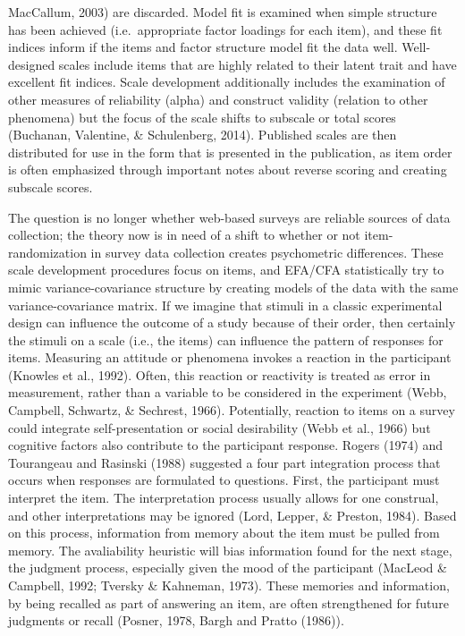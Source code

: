 \documentclass[english,man, mask]{apa6}
\theoremstyle{definition}
\theoremstyle{definition}
\theoremstyle{definition}
\theoremstyle{remark}
\begin{document}
MacCallum, 2003) are discarded. Model fit is examined when simple
structure has been achieved (i.e.~appropriate factor loadings for each
item), and these fit indices inform if the items and factor structure
model fit the data well. Well-designed scales include items that are
highly related to their latent trait and have excellent fit indices.
Scale development additionally includes the examination of other
measures of reliability (alpha) and construct validity (relation to
other phenomena) but the focus of the scale shifts to subscale or total
scores (Buchanan, Valentine, \& Schulenberg, 2014). Published scales are
then distributed for use in the form that is presented in the
publication, as item order is often emphasized through important notes
about reverse scoring and creating subscale scores.

The question is no longer whether web-based surveys are reliable sources
of data collection; the theory now is in need of a shift to whether or
not item-randomization in survey data collection creates psychometric
differences. These scale development procedures focus on items, and
EFA/CFA statistically try to mimic variance-covariance structure by
creating models of the data with the same variance-covariance matrix. If
we imagine that stimuli in a classic experimental design can influence
the outcome of a study because of their order, then certainly the
stimuli on a scale (i.e., the items) can influence the pattern of
responses for items. Measuring an attitude or phenomena invokes a
reaction in the participant (Knowles et al., 1992). Often, this reaction
or reactivity is treated as error in measurement, rather than a variable
to be considered in the experiment (Webb, Campbell, Schwartz, \&
Sechrest, 1966). Potentially, reaction to items on a survey could
integrate self-presentation or social desirability (Webb et al., 1966)
but cognitive factors also contribute to the participant response.
Rogers (1974) and Tourangeau and Rasinski (1988) suggested a four part
integration process that occurs when responses are formulated to
questions. First, the participant must interpret the item. The
interpretation process usually allows for one construal, and other
interpretations may be ignored (Lord, Lepper, \& Preston, 1984). Based
on this process, information from memory about the item must be pulled
from memory. The avaliability heuristic will bias information found for
the next stage, the judgment process, especially given the mood of the
participant (MacLeod \& Campbell, 1992; Tversky \& Kahneman, 1973).
These memories and information, by being recalled as part of answering
an item, are often strengthened for future judgments or recall (Posner,
1978, Bargh and Pratto (1986)).
\end{document}
